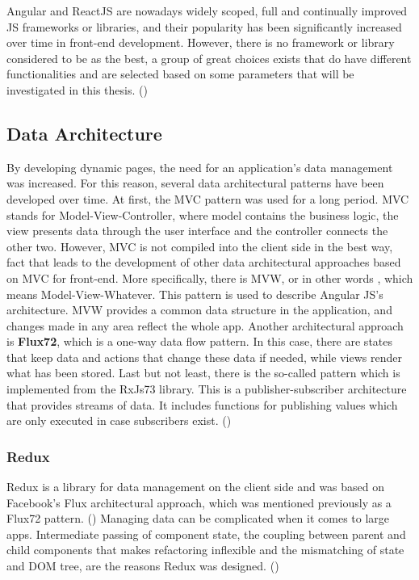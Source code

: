 Angular and ReactJS are nowadays widely scoped, full and continually improved JS frameworks or libraries, and their popularity has been significantly increased over time in front-end development. However, there is no framework or library considered to be as the best, a group of great choices exists that do have different functionalities and are selected based on some parameters that will be investigated in this thesis. (\cite{Reference6}) \par

\subsection{Data Architecture}

By developing dynamic pages, the need for an application's data management was increased. For this reason, several data architectural patterns have been developed over time. At first, the MVC pattern was used for a long period. MVC stands for Model-View-Controller, where model contains the business logic, the view presents data through the user interface and the controller connects the other two. However, MVC is not compiled into the client side in the best way, fact that leads to the development of other data architectural approaches based on MVC for front-end. More specifically, there is MVW, or in other words , which means Model-View-Whatever. This pattern is used to describe Angular JS's architecture. MVW provides a common data structure in the application, and changes made in any area reflect the whole app. Another architectural approach is \textbf{Flux72}, which is a one-way data flow pattern. In this case, there are states that keep data and actions that change these data if needed, while views render what has been stored. Last but not least, there is the so-called  pattern which is implemented from the RxJs73 library. This is a publisher-subscriber architecture that provides streams of data. It includes functions for publishing values which are only executed in case subscribers exist. (\cite{murray2018ng}) \par

\subsubsection{Redux}

Redux is a library for data management on the client side and was based on Facebook's Flux architectural approach, which was mentioned previously as a Flux72 pattern. (\cite{Reference13}) Managing data can be complicated when it comes to large apps. Intermediate passing of component state, the coupling between parent and child components that makes refactoring inflexible and the mismatching of state and DOM tree, are the reasons Redux was designed. (\citeyearpar{murray2018ng}) \par

